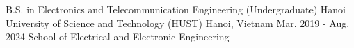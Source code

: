 

\begin{cventries}

  \cventry
    {B.S. in Electronics and Telecommunication Engineering (Undergraduate)} %
    {Hanoi University of Science and Technology (HUST)} %
    {Hanoi, Vietnam} %
    {Mar. 2019 - Aug. 2024} %
    {School of Electrical and Electronic Engineering}

\end{cventries}
